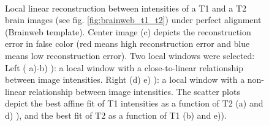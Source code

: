 \begin{figure}[t!]
\centering
    \\
    \caption{Local linear reconstruction between intensities of a T1 and a T2 brain images (see fig. \ref{fig:brainweb_t1_t2}) under perfect alignment (Brainweb template). Center image (c) depicts the reconstruction error in false color (red means high reconstruction error and blue means low reconstruction error). Two local windows were selected: Left ( a)-b) ): a local window with a close-to-linear relationship between image intensities. Right (d) e) ): a local window with a non-linear relationship between image intensities. The scatter plots depict the best affine fit of T1 intensities as a function of T2 (a) and d) ), and the best fit of T2 as a function of T1 (b) and e)).}
\label{fig:llr_test}
\end{figure}

